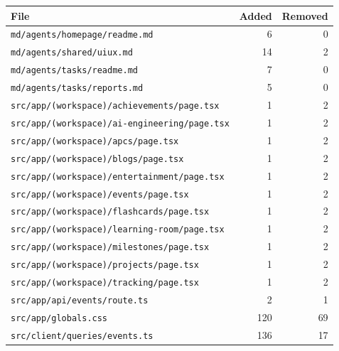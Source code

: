 \begin{longtable}{p{}rr}
\toprule File & Added & Removed \\
\midrule\endhead
\texttt{md/\allowbreak{}agents/\allowbreak{}homepage/\allowbreak{}readme.md} & 6 & 0 \\
\texttt{md/\allowbreak{}agents/\allowbreak{}shared/\allowbreak{}uiux.md} & 14 & 2 \\
\texttt{md/\allowbreak{}agents/\allowbreak{}tasks/\allowbreak{}readme.md} & 7 & 0 \\
\texttt{md/\allowbreak{}agents/\allowbreak{}tasks/\allowbreak{}reports.md} & 5 & 0 \\
\texttt{src/\allowbreak{}app/\allowbreak{}(workspace)/\allowbreak{}achievements/\allowbreak{}page.tsx} & 1 & 2 \\
\texttt{src/\allowbreak{}app/\allowbreak{}(workspace)/\allowbreak{}ai-engineering/\allowbreak{}page.tsx} & 1 & 2 \\
\texttt{src/\allowbreak{}app/\allowbreak{}(workspace)/\allowbreak{}apcs/\allowbreak{}page.tsx} & 1 & 2 \\
\texttt{src/\allowbreak{}app/\allowbreak{}(workspace)/\allowbreak{}blogs/\allowbreak{}page.tsx} & 1 & 2 \\
\texttt{src/\allowbreak{}app/\allowbreak{}(workspace)/\allowbreak{}entertainment/\allowbreak{}page.tsx} & 1 & 2 \\
\texttt{src/\allowbreak{}app/\allowbreak{}(workspace)/\allowbreak{}events/\allowbreak{}page.tsx} & 1 & 2 \\
\texttt{src/\allowbreak{}app/\allowbreak{}(workspace)/\allowbreak{}flashcards/\allowbreak{}page.tsx} & 1 & 2 \\
\texttt{src/\allowbreak{}app/\allowbreak{}(workspace)/\allowbreak{}learning-room/\allowbreak{}page.tsx} & 1 & 2 \\
\texttt{src/\allowbreak{}app/\allowbreak{}(workspace)/\allowbreak{}milestones/\allowbreak{}page.tsx} & 1 & 2 \\
\texttt{src/\allowbreak{}app/\allowbreak{}(workspace)/\allowbreak{}projects/\allowbreak{}page.tsx} & 1 & 2 \\
\texttt{src/\allowbreak{}app/\allowbreak{}(workspace)/\allowbreak{}tracking/\allowbreak{}page.tsx} & 1 & 2 \\
\texttt{src/\allowbreak{}app/\allowbreak{}api/\allowbreak{}events/\allowbreak{}route.ts} & 2 & 1 \\
\texttt{src/\allowbreak{}app/\allowbreak{}globals.css} & 120 & 69 \\
\texttt{src/\allowbreak{}client/\allowbreak{}queries/\allowbreak{}events.ts} & 136 & 17 \\

\end{longtable}
